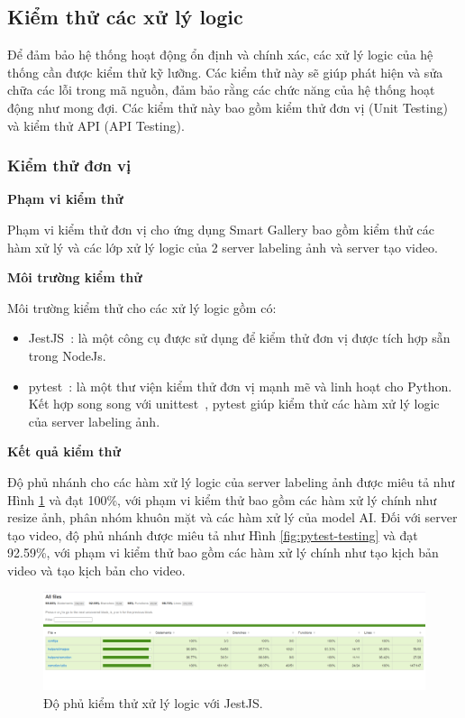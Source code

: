 \subsection{Kiểm thử các xử lý logic}

Để đảm bảo hệ thống hoạt động ổn định và chính xác, các xử lý logic của hệ thống cần được kiểm thử kỹ lưỡng. Các kiểm thử này sẽ giúp phát hiện và sửa chữa các lỗi trong mã nguồn, đảm bảo rằng các chức năng của hệ thống hoạt động như mong đợi. Các kiểm thử này bao gồm kiểm thử đơn vị (Unit Testing) và kiểm thử API (API Testing).
\subsubsection{Kiểm thử đơn vị}


\textbf{Phạm vi kiểm thử}

Phạm vi kiểm thử đơn vị cho ứng dụng Smart Gallery bao gồm kiểm thử các hàm xử lý và các lớp xử lý logic của 2 server labeling ảnh và server tạo video. 

\textbf{Môi trường kiểm thử}

Môi trường kiểm thử cho các xử lý logic gồm có: 
\begin{itemize}
    \item JestJS~\cite{jestJS}: là một công cụ được sử
    dụng để kiểm thử đơn vị được tích hợp sẵn trong NodeJs.
    \item pytest~\cite{pytest}: là một thư viện kiểm thử đơn vị mạnh mẽ và linh hoạt cho Python. Kết hợp song song với unittest~\cite{unittest}, pytest giúp kiểm thử các hàm xử lý logic của server labeling ảnh.
\end{itemize}

\textbf{Kết quả kiểm thử}

Độ phủ nhánh cho các hàm xử lý logic của server labeling ảnh được miêu tả như Hình \ref{fig:jest-testing} và đạt 100\%, với phạm vi kiểm thử bao gồm các hàm xử lý chính như resize ảnh, phân nhóm khuôn mặt và các hàm xử lý của model AI. Đối với server tạo video, độ phủ nhánh được miêu tả như Hình \ref{fig:pytest-testing} và đạt 92.59\%, với phạm vi kiểm thử bao gồm các hàm xử lý chính như tạo kịch bản video và tạo kịch bản cho video. 

\begin{figure}[H]
    \centering  
    \includegraphics[width=1\textwidth]{figures/c4/4-3/jest.png}
    \caption{Độ phủ kiểm thử xử lý logic với JestJS.}
    \label{fig:jest-testing}
\end{figure}


